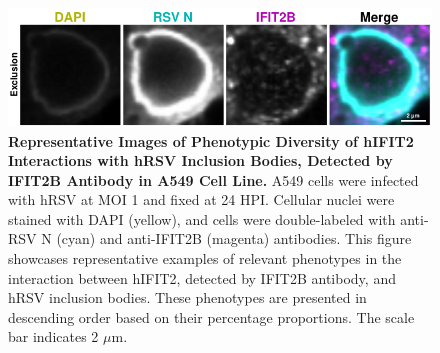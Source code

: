 \begin{figure}
    \centering
    \includegraphics[width=1\linewidth]{08. Chapter 3/Figs/02. Infection/02. IFIT2/02. IFIT2B/03. i2b-a549.pdf} 
    \caption[Representative Images of Phenotypic Diversity of hIFIT2 Interactions with hRSV Inclusion Bodies, Detected by IFIT2B Antibody in A549 Cell Line.]{\textbf{Representative Images of Phenotypic Diversity of hIFIT2 Interactions with hRSV Inclusion Bodies, Detected by IFIT2B Antibody in A549 Cell Line.} A549 cells were infected with hRSV at MOI 1 and fixed at 24 HPI. Cellular nuclei were stained with DAPI (yellow), and cells were double-labeled with anti-RSV N (cyan) and anti-IFIT2B (magenta) antibodies. This figure showcases representative examples of relevant phenotypes in the interaction between hIFIT2, detected by IFIT2B antibody, and hRSV inclusion bodies. These phenotypes are presented in descending order based on their percentage proportions. The scale bar indicates 2 \(\mu \mbox{m}\).}
    \label{fig:Representative Images of Phenotypic Diversity of hIFIT2 Interactions with hRSV Inclusion Bodies, Detected by IFIT2B Antibody in A549 Cell Line}
\end{figure}


